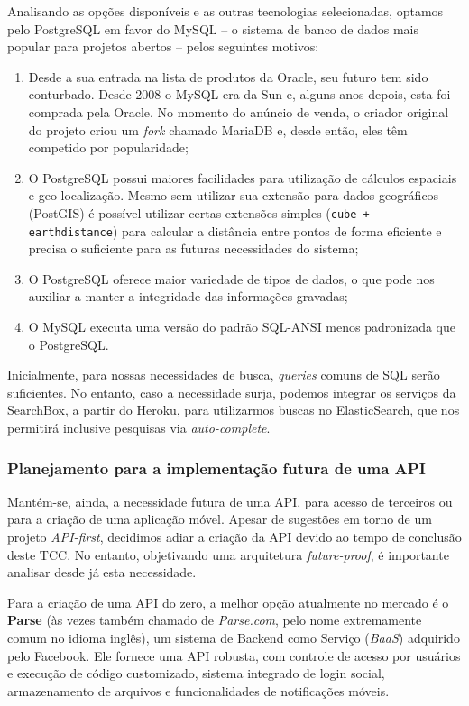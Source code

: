 \documentclass[12pt,a4paper,twoside,hyphens,english,brazil]{abntex2}
\begin{document}
{Analisando as opções disponíveis e as outras tecnologias selecionadas, optamos pelo PostgreSQL em favor do MySQL -- o sistema de banco de dados mais popular para projetos abertos\cite{db-engines-ranking} -- pelos seguintes motivos:
\begin{enumerate}
	\item Desde a sua entrada na lista de produtos da Oracle, seu futuro tem sido conturbado. Desde 2008 o MySQL era da Sun e, alguns anos depois, esta foi comprada pela Oracle. No momento do anúncio de venda, o criador original do projeto criou um \emph{fork} chamado MariaDB\cite{mysql-fork} e, desde então, eles têm competido por popularidade;
	\item O PostgreSQL possui maiores facilidades para utilização de cálculos espaciais e geo-localização. Mesmo sem utilizar sua extensão para dados geográficos (PostGIS) é possível utilizar certas extensões simples (\texttt{cube + earthdistance}) para calcular a distância entre pontos de forma eficiente e precisa o suficiente para as futuras necessidades do sistema\cite{postgre-earthdistance};
	\item O PostgreSQL oferece maior variedade de tipos de dados, o que pode nos auxiliar a manter a integridade das informações gravadas;
	\item O MySQL executa uma versão do padrão SQL-ANSI menos padronizada que o PostgreSQL.
\end{enumerate}

Inicialmente, para nossas necessidades de busca, \emph{queries} comuns de SQL serão suficientes. No entanto, caso a necessidade surja, podemos integrar os serviços da SearchBox, a partir do Heroku, para utilizarmos buscas no ElasticSearch, que nos permitirá inclusive pesquisas via \emph{auto-complete}.

\subsubsection{Planejamento para a implementação futura de uma API}
Mantém-se, ainda, a necessidade futura de uma API, para acesso de terceiros ou para a criação de uma aplicação móvel. Apesar de sugestões em torno de um projeto \emph{API-first}, decidimos adiar a criação da API devido ao tempo de conclusão deste TCC. No entanto, objetivando uma arquitetura \emph{future-proof}, é importante analisar desde já esta necessidade.

Para a criação de uma API do zero, a melhor opção atualmente no mercado é o \textbf{Parse} (às vezes também chamado de \emph{Parse.com}, pelo nome extremamente comum no idioma inglês), um sistema de Backend como Serviço (\textit{BaaS}) adquirido pelo Facebook\cite{facebook-buys-parse}. Ele fornece uma API robusta, com controle de acesso por usuários e execução de código customizado, sistema integrado de login social, armazenamento de arquivos e funcionalidades de notificações móveis.

}
\end{document}
